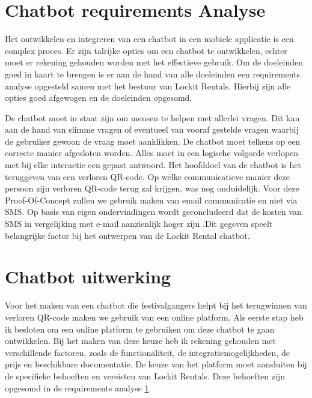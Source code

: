 \section{Chatbot requirements Analyse}%
\label{sec:chatbotRequirment}

Het ontwikkelen en integreren van een chatbot in een mobiele applicatie is een complex proces. Er zijn talrijke opties om een chatbot te ontwikkelen, echter moet er rekening gehouden worden met het effectieve gebruik. Om de doeleinden goed in kaart te brengen is er aan de hand van alle doeleinden een requirements analyse opgesteld samen met het bestuur van Lockit Rentals. Hierbij zijn alle opties goed afgewogen en de doeleinden opgesomd.

De chatbot moet in staat zijn om mensen te helpen met allerlei vragen. Dit kan aan de hand van slimme vragen of eventueel van vooraf gestelde vragen waarbij de gebruiker gewoon de vraag moet aanklikken. De chatbot moet telkens op een correcte manier afgesloten worden. Alles moet in een logische volgorde verlopen met bij elke interactie een gepast antwoord. Het hoofddoel van de chatbot is het teruggeven van een verloren QR-code. Op welke communicatieve manier deze persoon zijn verloren QR-code terug zal krijgen, was nog onduidelijk. Voor deze Proof-Of-Concept zullen we gebruik maken van email communicatie en niet via SMS. Op basis van eigen ondervindingen wordt geconcludeerd dat de kosten van SMS in vergelijking met e-mail aanzienlijk hoger zijn \autocite{Paavola2023} .Dit gegeven speelt belangrijke factor bij het ontwerpen van de Lockit Rental chatbot. 

\section{Chatbot uitwerking}%
\label{sec:chatbotUitwerking}

Voor het maken van een chatbot die festivalgangers helpt bij het terugwinnen van verloren QR-code maken we gebruik van een online platform. Als eerste stap heb ik besloten om een online platform te gebruiken om deze chatbot te gaan ontwikkelen. Bij het maken van deze keuze heb ik rekening gehouden met verschillende factoren, zoals de functionaliteit, de integratiemogelijkheden, de prijs en beschikbare documentatie. De keuze van het platform moet aansluiten bij de specifieke behoeften en vereisten van Lockit Rentals. Deze behoeften zijn opgesomd in de requirements analyse \ref{sec:chatbotRequirment}.

